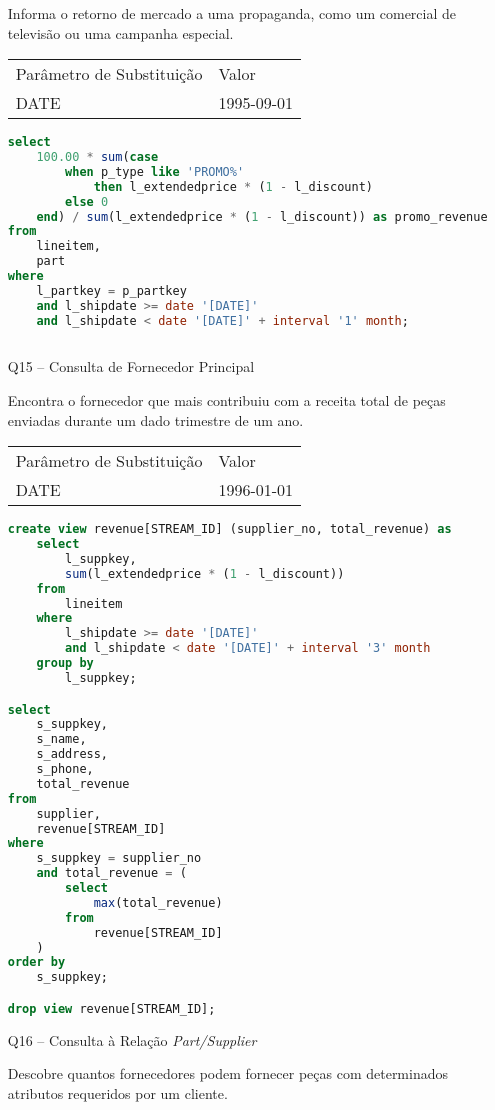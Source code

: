 \begin{enumerate}
Informa o retorno de mercado a uma propaganda, como um comercial de televisão ou uma campanha especial.

\begin{tabular}{ll}
	Parâmetro de Substituição & Valor\\
	DATE & 1995-09-01\\
\end{tabular}

	\begin{lstlisting}[language=SQL]
select
	100.00 * sum(case
		when p_type like 'PROMO%'
			then l_extendedprice * (1 - l_discount)
		else 0
	end) / sum(l_extendedprice * (1 - l_discount)) as promo_revenue
from
	lineitem,
	part
where
	l_partkey = p_partkey
	and l_shipdate >= date '[DATE]'
	and l_shipdate < date '[DATE]' + interval '1' month;
	
	\end{lstlisting}

\item[Q15 --] Consulta de Fornecedor Principal

Encontra o fornecedor que mais contribuiu com a receita total de peças enviadas durante um dado trimestre de um ano.

\begin{tabular}{ll}
	Parâmetro de Substituição & Valor\\
	DATE & 1996-01-01\\
\end{tabular}

	\begin{lstlisting}[language=SQL]
create view revenue[STREAM_ID] (supplier_no, total_revenue) as
	select
		l_suppkey,
		sum(l_extendedprice * (1 - l_discount))
	from
		lineitem
	where
		l_shipdate >= date '[DATE]'
		and l_shipdate < date '[DATE]' + interval '3' month
	group by
		l_suppkey;

select
	s_suppkey,
	s_name,
	s_address,
	s_phone,
	total_revenue
from
	supplier,
	revenue[STREAM_ID]
where
	s_suppkey = supplier_no
	and total_revenue = (
		select
			max(total_revenue)
		from
			revenue[STREAM_ID]
	)
order by
	s_suppkey;

drop view revenue[STREAM_ID];

	\end{lstlisting}

\item[Q16 --] Consulta à Relação \textit{Part/Supplier}

Descobre quantos fornecedores podem fornecer peças com determinados atributos requeridos por um cliente. 


\end{enumerate}
